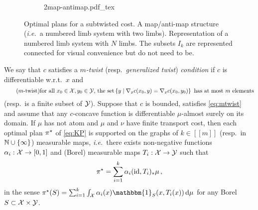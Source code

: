         \begin{figure}[!h]
            \centering
            \begin{subfigure}[b]{.49\linewidth}
                \centering
                \def\svgwidth{\linewidth}
                {2map-antimap.pdf_tex}
                \label{fig:subtwist-map-antimap}
            \end{subfigure}
            \hfill
            \begin{subfigure}[b]{.49\linewidth}
                \centering
                
                \label{fig:subtwist-nls}
                \vspace{1.2cm}
            \end{subfigure}
            \vspace{-3mm}
            \caption{Optimal plans for a subtwisted cost. \capleft A map/anti-map structure (\textit{i.e.}~a numbered limb system with two limbs). \capright Representation of a numbered limb system with $N$ limbs. The subsets $I_k$ are represented connected for visual convenience but do not need to be.}
            \label{fig:subtwist}
        \end{figure}
        \begin{proposition}[$m$-twist]
            \label{prop:mtwist}
            We say that $c$ satisfies a \emph{$m$-twist} (resp.~\emph{generalized twist}) \emph{condition} if $c$ is differentiable w.r.t.~$x$ and
            \begin{equation}
                \tag{$m$-twist}
                \text{for all } x_{0} \in \mathcal{X},y_{0} \in \mathcal{Y}\text{, the set} \left\{y \mid \nabla_x c(x_{0}, y)=\nabla_x c(x_{0}, y_{0})\right\}\text{ has at most } m \text{ elements}
                \label{eq:mtwist}
            \end{equation}
            (resp.~is a finite subset of $\mathcal{Y}$). Suppose that $c$ is bounded, satisfies \cref{eq:mtwist} and assume that any $c$-concave function is differentiable $\mu$-almost surely on its domain. If $\mu$ has not atom and $\mu$ and $\nu$ have finite transport cost, then each optimal plan $\pi^\star$ of \cref{eq:KP} is supported on the graphs of $k\in[\![m]\!]$ (resp.~in $\mathbb{N}\cup\{\infty\}$) measurable maps, \textit{i.e.}~there exists non-negative functions $\alpha_i:\mathcal{X}\to[0,1]$ and (Borel) measurable maps $T_i:\mathcal{X}\to\mathcal{Y}$ such that
            $$\pi^\star=\sum_{i=1}^{k} \alpha_{i}(\operatorname{id}, T_i)_* \mu\,,$$
            in the sense $\pi\opt(S)=\sum_{i=1}^k\int_\Xx\alpha_i(x)\mathbbm{1}_S(x,T_i(x))\dd\mu$ for any Borel $S\subset \mathcal{X}\times\mathcal{Y}$.
        \end{proposition}

